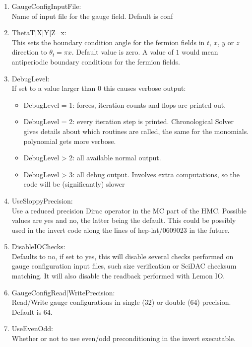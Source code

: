 \begin{enumerate}
\item {\ttfamily GaugeConfigInputFile}:\\
  Name of input file for the gauge field. Default is {\ttfamily conf}

\item {\ttfamily ThetaT|X|Y|Z=x}:\\
  This sets the boundary condition angle for the fermion fields in
  $t$, $x$, $y$ or $z$ direction to $\theta_t = \pi x$. Default value is
  zero. A value of $1$ would mean antiperiodic boundary conditions
  for the fermion fields.

\item {\ttfamily DebugLevel}:\\
  If set to a value larger than $0$ this causes verbose output:
  \begin{itemize}
  \item {\ttfamily DebugLevel = 1}: forces, iteration counts and flops are printed out.
  \item {\ttfamily DebugLevel = 2}: every iteration step is
    printed. Chronological Solver gives details about which routines
    are called, the same for the monomials. polynomial gets more verbose.
  \item {\ttfamily DebugLevel > 2}: all available normal output.
  \item {\ttfamily DebugLevel > 3}: all debug output. Involves extra
    computations, so the code will be (significantly) slower
  \end{itemize}

\item {\ttfamily UseSloppyPrecision}:\\
  Use a reduced precision Dirac operator in the MC part of the
  HMC. Possible values are yes and no, the latter being the
  default. This could be possibly used in the invert code along the 
  lines of {\ttfamily hep-lat/0609023} in the future.

\item {\ttfamily DisableIOChecks}:\\
  Defaults to no, if set to yes, this will disable several checks
  performed on gauge configuration input files, such size verification or
  SciDAC checksum matching. It will also disable the readback performed with
  Lemon IO.

\item {\ttfamily GaugeConfigRead|WritePrecision}:\\
  Read/Write gauge configurations in single (32) or double (64)
  precision. Default is 64.

\item {\ttfamily UseEvenOdd}:\\
  Whether or not to use even/odd preconditioning in the invert
  executable.

\end{enumerate}


